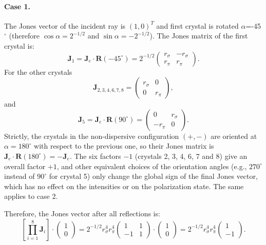 \documentclass{iucr}
\begin{document}
\paragraph{Case 1.}
The Jones vector of the incident ray is $(1,0)^T$ and first crystal is rotated $\alpha$=-45$^\circ$ (therefore $\cos\alpha=2^{-1/2}$ and $\sin\alpha=-2^{-1/2}$). The Jones matrix of the first crystal is:
\begin{equation}\label{eq:Jcase1_xtal1_S4}
    \textbf{J}_1=\textbf{J}_e \cdot \textbf{R}(-45^{\circ})
    =
    2^{-1/2}
    \begin{pmatrix}
r_\sigma  &
-r_\sigma \\
r_\pi&
r_\pi
\end{pmatrix}.
\end{equation}
For the other crystals
\begin{equation}\label{eq:Jcase1_S4}
\textbf{J}_{2,3,4,6,7,8}=
    \begin{pmatrix}
r_\sigma & 0\\
0& 
r_\pi
\end{pmatrix},
\end{equation}
and
\begin{equation}\label{eq:J5case1_S4}
\textbf{J}_{5}=\textbf{J}_e\cdot \textbf{R}(90^{\circ})
=
\begin{pmatrix}
0 & r_\sigma\\
-r_\pi& 0
\end{pmatrix}.
\end{equation}
Strictly, the crystals in the non-dispersive configuration $(+,-)$ are oriented at $\alpha=180^\circ$ with respect to the previous one, so their Jones matrix is $\textbf{J}_e\cdot\textbf{R}(180^\circ)=-\textbf{J}_e$. The six factors $-1$ (crystals 2, 3, 4, 6, 7 and 8) give an overall factor $+1$, and other equivalent choices of the orientation angles (e.g., $270^\circ$ instead of $90^\circ$ for crystal 5) only change the global sign of the final Jones vector, which has no effect on the intensities or on the polarization state. The same applies to case 2.

Therefore, the Jones vector after all reflections is:
\begin{equation}\label{eq:JVcase1_S4}
\left[ \prod_{i=1}^{8} \textbf{J}_i \right]
    \cdot
    \begin{pmatrix}
    1\\0
    \end{pmatrix}=
    2^{-1/2} r_\sigma^4 r_\pi^4
        \begin{pmatrix}
   1&1\\
    -1 & 1
    \end{pmatrix}
    \cdot
        \begin{pmatrix}
    1\\0
    \end{pmatrix}
    =
    2^{-1/2}r_\sigma^4 r_\pi^4
    \begin{pmatrix}
    1\\
    -1
    \end{pmatrix}.
\end{equation}
\end{document}
